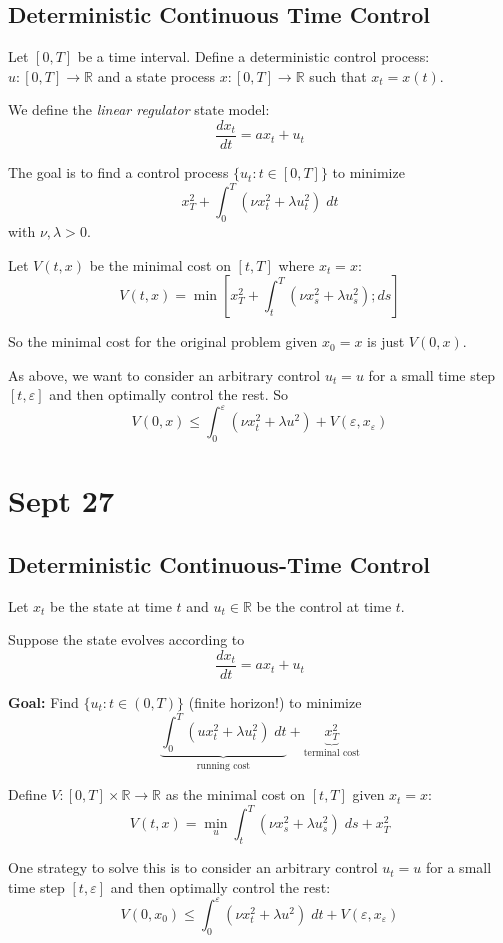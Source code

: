 \documentclass[12pt]{report}
\newcommand{\R}{\mathbb{R}}
\newcommand{\ep}{\varepsilon}
\begin{document}
    \subsection*{Deterministic Continuous Time Control}
        Let $[0, T]$ be a time interval. Define a deterministic control process: $u: [0, T] \to \R$ and a state process $x: [0, T] \to \R$ such that $x_t = x(t)$.

        We define the \emph{linear regulator} state model: 
        \[\frac{dx_t}{dt} = ax_t + u_t\]

        The goal is to find a control process $\{u_t: t \in [0, T]\}$ to minimize 
        \[x_T^2 + \int_0^T (\nu x_t^2 + \lambda u_t^2)\; dt\]
        with $\nu, \lambda > 0$. 

        Let $V(t, x)$ be the minimal cost on $[t, T]$ where $x_t = x$: 
        \[V(t, x) = \min\left[x_T^2 + \int_t^T (\nu x_s^2 + \lambda u_s^2); ds\right]\]

        So the minimal cost for the original problem given $x_0 = x$ is just $V(0, x)$.

        As above, we want to consider an arbitrary control $u_t = u$ for a small time step $[t, \ep]$ and then optimally control the rest. So 
        \[V(0, x) \leq \int_0^{\ep} (\nu x_t^2 + \lambda u^2) + V(\ep, x_{\ep})\] 

\section{Sept 27}
    \subsection*{Deterministic Continuous-Time Control}
        Let $x_t$ be the state at time $t$ and $u_t \in \R$ be the control at time $t$.

        Suppose the state evolves according to
        \[\frac{dx_t}{dt} = ax_t + u_t\]

        \textbf{Goal:} Find $\{u_t: t \in (0, T)\}$ (finite horizon!) to minimize 
        \[\underbrace{\int_0^T (u x_t^2 + \lambda u_t^2)\; dt}_{\text{running cost}} + \underbrace{x_T^2}_{\text{terminal cost}}\]

        Define $V: [0, T] \times \R \to \R$ as the minimal cost on $[t, T]$ given $x_t = x$:
        \[V(t, x) = \min_{u} \int_t^T (\nu x_s^2 + \lambda u_s^2)\; ds + x_T^2\]

        One strategy to solve this is to consider an arbitrary control $u_t = u$ for a small time step $[t, \ep]$ and then optimally control the rest: 
        \[V(0, x_0) \leq \int_0^{\ep} (\nu x_t^2 + \lambda u^2)\; dt + V(\ep, x_{\ep})\]
\end{document}
